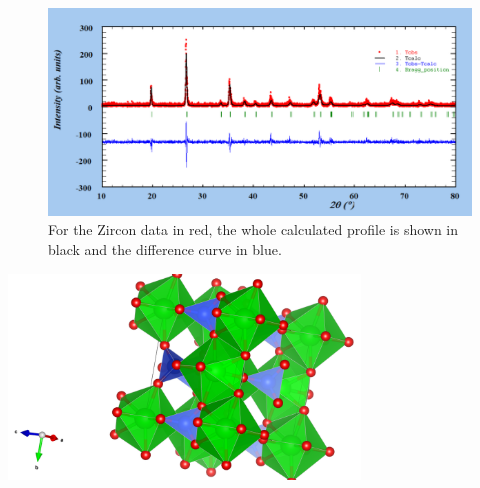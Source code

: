 \begin{center}
    \begin{figure}
    \centering
    \includegraphics[width = 0.9\textheight]{Pictures/Evaluation/43/ZrSiO4DataAll.png}
    \caption{
        For the Zircon data in red, the whole calculated profile is shown in black and the difference curve in blue.
    }
    \label{fig:ZrSiO4Prof}
    \end{figure}
\end{center}

\begin{center}
    \captionsetup{type = figure}
    \includegraphics[width = 0.7\textwidth]{Pictures/Evaluation/43/ZrSiO4StructurePolyhedral.png}
    \label{fig:ZrSiO4Struct}
\end{center}
